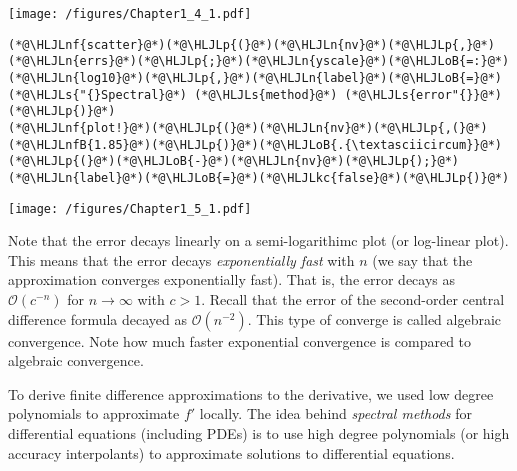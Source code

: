 \documentclass[12pt,landscape]{article}
\newcommand{\HLJLkc}[1]{\textcolor[RGB]{59,151,46}{\textit{#1}}}
\newcommand{\HLJLn}[1]{#1}
\newcommand{\HLJLnf}[1]{\textcolor[RGB]{66,102,213}{#1}}
\newcommand{\HLJLs}[1]{\textcolor[RGB]{201,61,57}{#1}}
\newcommand{\HLJLnfB}[1]{\textcolor[RGB]{59,151,46}{#1}}
\newcommand{\HLJLoB}[1]{\textcolor[RGB]{102,102,102}{\textbf{#1}}}
\newcommand{\HLJLp}[1]{#1}
\begin{document}
{\texttt{[image: /figures/Chapter1\_4\_1.pdf]}

\begin{lstlisting}
(*@\HLJLnf{scatter}@*)(*@\HLJLp{(}@*)(*@\HLJLn{nv}@*)(*@\HLJLp{,}@*)(*@\HLJLn{errs}@*)(*@\HLJLp{;}@*)(*@\HLJLn{yscale}@*)(*@\HLJLoB{=:}@*)(*@\HLJLn{log10}@*)(*@\HLJLp{,}@*)(*@\HLJLn{label}@*)(*@\HLJLoB{=}@*)(*@\HLJLs{"{}Spectral}@*) (*@\HLJLs{method}@*) (*@\HLJLs{error"{}}@*)(*@\HLJLp{)}@*)
(*@\HLJLnf{plot!}@*)(*@\HLJLp{(}@*)(*@\HLJLn{nv}@*)(*@\HLJLp{,(}@*)(*@\HLJLnfB{1.85}@*)(*@\HLJLp{)}@*)(*@\HLJLoB{.{\textasciicircum}}@*)(*@\HLJLp{(}@*)(*@\HLJLoB{-}@*)(*@\HLJLn{nv}@*)(*@\HLJLp{);}@*)(*@\HLJLn{label}@*)(*@\HLJLoB{=}@*)(*@\HLJLkc{false}@*)(*@\HLJLp{)}@*)
\end{lstlisting}

\texttt{[image: /figures/Chapter1\_5\_1.pdf]}

Note that the error decays linearly on a semi-logarithimc plot (or log-linear plot).  This means that the error decays \emph{exponentially fast} with $n$ (we say that the approximation converges exponentially fast).  That is, the error decays as $\mathcal{O}(c^{-n})$ for $n \to \infty$ with $c > 1$.  Recall that the error of the second-order central difference formula decayed as $\mathcal{O}(n^{-2})$.  This type of converge is  called algebraic convergence.  Note how much faster exponential convergence is compared to algebraic convergence.

To derive finite difference approximations to the derivative, we used low degree polynomials to approximate $f'$ locally.  The idea behind \emph{spectral methods} for differential equations (including PDEs) is to use high degree polynomials (or high accuracy interpolants) to approximate solutions to differential equations.


}
\end{document}
